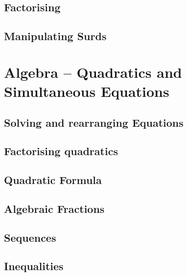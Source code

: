 \documentclass[
]{book}
\begin{document}
\hypertarget{factorising}{%
\section{Factorising}\label{factorising}}

\hypertarget{manipulating-surds}{%
\section{Manipulating Surds}\label{manipulating-surds}}

\hypertarget{algebra-quadratics-and-simultaneous-equations}{%
\chapter{Algebra -- Quadratics and Simultaneous Equations}\label{algebra-quadratics-and-simultaneous-equations}}

\hypertarget{solving-and-rearranging-equations}{%
\section{Solving and rearranging Equations}\label{solving-and-rearranging-equations}}

\hypertarget{factorising-quadratics}{%
\section{Factorising quadratics}\label{factorising-quadratics}}

\hypertarget{quadratic-formula}{%
\section{Quadratic Formula}\label{quadratic-formula}}

\hypertarget{algebraic-fractions}{%
\section{Algebraic Fractions}\label{algebraic-fractions}}

\hypertarget{sequences}{%
\section{Sequences}\label{sequences}}

\hypertarget{inequalities}{%
\section{Inequalities}\label{inequalities}}
\end{document}
